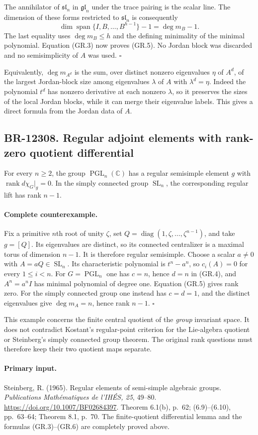 The annihilator of $\mathfrak{sl}_n$ in
$\mathfrak{gl}_n$ under the trace pairing is the scalar line.
The dimension of these forms restricted to $\mathfrak{sl}_n$
is consequently
\[
 \dim\operatorname{span}\{I,B,\ldots,B^{h-1}\}-1
 =\deg m_B-1.
\]
The last equality uses $\deg m_B\leq h$ and the defining
minimality of the minimal polynomial.  Equation (GR.3) now
proves (GR.5).  No Jordan block was discarded and no
semisimplicity of $A$ was used. \(\square\)

Equivalently, $\deg m_{A^d}$ is the sum, over distinct nonzero
eigenvalues $\eta$ of $A^d$, of the largest Jordan-block size
among eigenvalues $\lambda$ of $A$ with $\lambda^d=\eta$.
Indeed the polynomial $t^d$ has nonzero derivative at each
nonzero $\lambda$, so it preserves the sizes of the local
Jordan blocks, while it can merge their eigenvalue labels.
This gives a direct formula from the Jordan data of $A$.

\subsection{BR-12308. Regular adjoint elements with rank-zero quotient differential}
For every $n\geq2$, the group $\operatorname{PGL}_n(\mathbb C)$
has a regular semisimple element $g$ with
$\operatorname{rank}d\chi_G|_g=0$.
In the simply connected group $\operatorname{SL}_n$, the
corresponding regular lift has rank $n-1$.

\paragraph{Complete counterexample.}
Fix a primitive $n$th root of unity $\zeta$, set
$Q=\operatorname{diag}(1,\zeta,\ldots,\zeta^{n-1})$, and
take $g=[Q]$.  Its eigenvalues are distinct, so its connected
centralizer is a maximal torus of dimension $n-1$.  It is
therefore regular semisimple.  Choose a scalar $a\ne0$ with
$A=aQ\in\operatorname{SL}_n$.  Its characteristic polynomial
is $t^n-a^n$, so $c_i(A)=0$ for every $1\leq i<n$.
For $G=\operatorname{PGL}_n$ one has $c=n$, hence $d=n$ in
(GR.4), and $A^n=a^n I$ has minimal polynomial of degree one.
Equation (GR.5) gives rank zero.  For the simply connected
group one instead has $c=d=1$, and the distinct eigenvalues
give $\deg m_A=n$, hence rank $n-1$.
\(\square\)

This example concerns the finite central quotient of the
\emph{group} invariant space.  It does not contradict Kostant's
regular-point criterion for the Lie-algebra quotient or Steinberg's
simply connected group theorem.  The original rank questions
must therefore keep their two quotient maps separate.

\paragraph{Primary input.}
Steinberg, R. (1965). Regular elements of semi-simple algebraic
groups. \emph{Publications Math\'ematiques de l'IH\'ES, 25},
49--80. \url{https://doi.org/10.1007/BF02684397}.
Theorem 6.1(b), p.~62; (6.9)--(6.10), pp.~63--64;
Theorem 8.1, p.~70. The finite-quotient differential lemma and
the formulas (GR.3)--(GR.6) are completely proved above.
